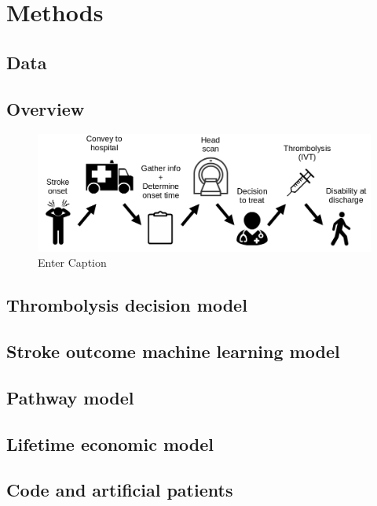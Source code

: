 \section{Methods}

\subsection{Data}

\subsection{Overview}

\begin{figure}
    \centering
    \includegraphics[width=0.75\linewidth]{images/flow}
    \caption{Enter Caption}
    \label{flow}
\end{figure}

\subsection{Thrombolysis decision model}

\subsection{Stroke outcome machine learning model}

\subsection{Pathway model}

\subsection{Lifetime economic model}

\subsection{Code and artificial patients}